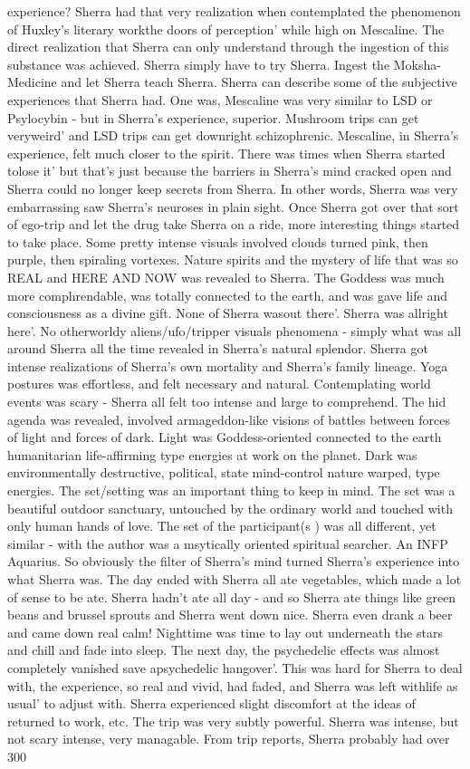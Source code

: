 \documentclass[12pt]{book}
\begin{document}
experience? Sherra had that very realization when contemplated the phenomenon of Huxley's literary workthe doors of perception' while high on Mescaline. The direct realization that Sherra can only understand through the ingestion of this substance was achieved. Sherra simply have to try Sherra. Ingest the Moksha-Medicine and let Sherra teach Sherra. Sherra can describe some of the subjective experiences that Sherra had. One was, Mescaline was very similar to LSD or Psylocybin - but in Sherra's experience, superior. Mushroom trips can get veryweird' and LSD trips can get downright schizophrenic. Mescaline, in Sherra's experience, felt much closer to the spirit. There was times when Sherra started tolose it' but that's just because the barriers in Sherra's mind cracked open and Sherra could no longer keep secrets from Sherra. In other words, Sherra was very embarrassing saw Sherra's neuroses in plain sight. Once Sherra got over that sort of ego-trip and let the drug take Sherra on a ride, more interesting things started to take place. Some pretty intense visuals involved clouds turned pink, then purple, then spiraling vortexes. Nature spirits and the mystery of life that was so REAL and HERE AND NOW was revealed to Sherra. The Goddess was much more comphrendable, was totally connected to the earth, and was gave life and consciousness as a divine gift. None of Sherra wasout there'. Sherra was allright here'. No otherworldy aliens/ufo/tripper visuals phenomena - simply what was all around Sherra all the time revealed in Sherra's natural splendor. Sherra got intense realizations of Sherra's own mortality and Sherra's family lineage. Yoga postures was effortless, and felt necessary and natural. Contemplating world events was scary - Sherra all felt too intense and large to comprehend. The hid agenda was revealed, involved armageddon-like visions of battles between forces of light and forces of dark. Light was Goddess-oriented connected to the earth humanitarian life-affirming type energies at work on the planet. Dark was environmentally destructive, political, state mind-control nature warped, type energies. The set/setting was an important thing to keep in mind. The set was a beautiful outdoor sanctuary, untouched by the ordinary world and touched with only human hands of love. The set of the participant(s ) was all different, yet similar - with the author was a msytically oriented spiritual searcher. An INFP Aquarius. So obviously the filter of Sherra's mind turned Sherra's experience into what Sherra was. The day ended with Sherra all ate vegetables, which made a lot of sense to be ate. Sherra hadn't ate all day - and so Sherra ate things like green beans and brussel sprouts and Sherra went down nice. Sherra even drank a beer and came down real calm! Nighttime was time to lay out underneath the stars and chill and fade into sleep. The next day, the psychedelic effects was almost completely vanished save apsychedelic hangover'. This was hard for Sherra to deal with, the experience, so real and vivid, had faded, and Sherra was left withlife as usual' to adjust with. Sherra experienced slight discomfort at the ideas of returned to work, etc. The trip was very subtly powerful. Sherra was intense, but not scary intense, very managable. From trip reports, Sherra probably had over 300 
\end{document}
